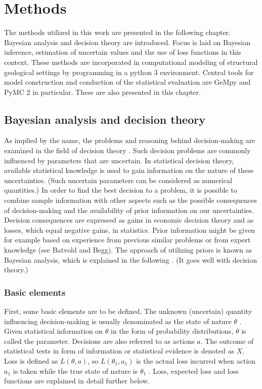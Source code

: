     \chapter{Methods}\label{cha:met}

    The methods utilized in this work are presented in the following chapter. Bayesian analysis and decision theory are introduced. Focus is laid on Bayesian inference, estimation of uncertain values and the use of loss functions in this context. These methods are incorporated in computational modeling of structural geological settings by programming in a python 3 environment. Central tools for model construction and conduction of the statistical evaluation are GeMpy and PyMC 2 in particular. These are also presented in this chapter.
    
        \section{Bayesian analysis and decision theory}
	    As implied by the name, the problems and reasoning behind decision-making are examined in the field of decision theory \citep{berger2013stat}. Such decision problems are commonly influenced by parameters that are uncertain. In statistical decision theory, available statistical knowledge is used to gain information on the nature of these uncertainties. (Such uncertain parameters can be considered as numerical quantities.) In order to find the best decision to a problem, it is possible to combine sample information with other aspects such as the possible consequences of decision-making and the availability of prior information on our uncertainties. Decision consequences are expressed as gains in economic decision theory and as losses, which equal negative gains, in statistics. Prior information might be given for example based on experience from previous similar problems or from expert knowledge (see Batvold and Begg). The approach of utilizing priors is known as Bayesian analysis, which is explained in the following \citep{berger2013stat}. (It goes well with decision theory.)
	    
	    \subsection{Basic elements}
	    First, some basic elements are to be defined. The unknown (uncertain) quantity influencing decision-making is usually denominated as the state of nature $\theta$ \citep{berger2013stat}. Given statistical information on $\theta$ in the form of probability distributions, $\theta$ is called the parameter. 
	    Decisions are also referred to as actions $a$.
	    The outcome of statistical tests in form of information or statistical evidence is denoted as $X$.	    
	    Loss is defined as $L(\theta,a)$, so $L(\theta_1,a_1)$ is the actual loss incurred when action $a_1$ is taken while the true state of nature is $\theta_1$ \citep{berger2013stat}. Loss, expected loss and loss functions are explained in detail further below.  
        
